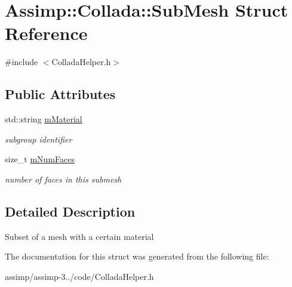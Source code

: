 \hypertarget{struct_assimp_1_1_collada_1_1_sub_mesh}{\section{Assimp\+:\+:Collada\+:\+:Sub\+Mesh Struct Reference}
\label{struct_assimp_1_1_collada_1_1_sub_mesh}
}


{\ttfamily \#include $<$Collada\+Helper.\+h$>$}

\subsection*{Public Attributes}
\begin{DoxyCompactItemize}
\item 
\hypertarget{struct_assimp_1_1_collada_1_1_sub_mesh_ac324a5a47ad81f7ec1f6682eebc199e3}{std\+::string \hyperlink{struct_assimp_1_1_collada_1_1_sub_mesh_ac324a5a47ad81f7ec1f6682eebc199e3}{m\+Material}}\label{struct_assimp_1_1_collada_1_1_sub_mesh_ac324a5a47ad81f7ec1f6682eebc199e3}

\begin{DoxyCompactList}\small\item\em subgroup identifier \end{DoxyCompactList}\item 
\hypertarget{struct_assimp_1_1_collada_1_1_sub_mesh_a0b905c6d220f7275d38922123ebaf0c7}{size\+\_\+t \hyperlink{struct_assimp_1_1_collada_1_1_sub_mesh_a0b905c6d220f7275d38922123ebaf0c7}{m\+Num\+Faces}}\label{struct_assimp_1_1_collada_1_1_sub_mesh_a0b905c6d220f7275d38922123ebaf0c7}

\begin{DoxyCompactList}\small\item\em number of faces in this submesh \end{DoxyCompactList}\end{DoxyCompactItemize}


\subsection{Detailed Description}
Subset of a mesh with a certain material 

The documentation for this struct was generated from the following file\+:\begin{DoxyCompactItemize}
\item 
assimp/assimp-\/3../code/Collada\+Helper.\+h\end{DoxyCompactItemize}
